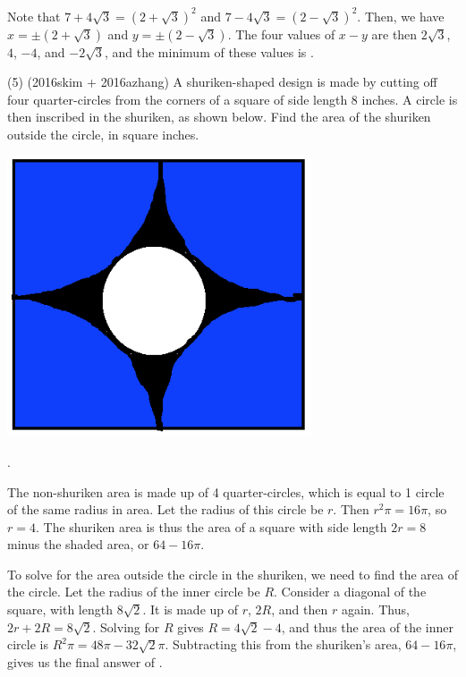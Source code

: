 \documentclass[11pt]{article}
\begin{document}
\begin{solution}
Note that $7 + 4\sqrt{3} = (2 + \sqrt{3})^2$ and $7 - 4\sqrt{3} = (2 - \sqrt{3})^2$. Then, we have $x = \pm(2 + \sqrt{3})$ and $y = \pm(2 - \sqrt{3})$. The four values of $x-y$ are then $2\sqrt{3}$, $4$, $-4$, and $-2\sqrt{3}$, and the minimum of these values is .
\end{solution}

\begin{problem}
(5) (2016skim + 2016azhang) A shuriken-shaped design is made by cutting off four quarter-circles from the corners of a square of side length 8 inches. A circle is then inscribed in the shuriken, as shown below. Find the area of the shuriken outside the circle, in square inches.
\begin{center}
\includegraphics[width=9cm]{shuriken.png}
\end{center}
\end{problem}

\begin{answer}
.
\end{answer}

\begin{solution}
The non-shuriken area is made up of 4 quarter-circles, which is equal to 1 circle of the same radius in area. Let the radius of this circle be $r$. Then $r^{2}\pi = 16\pi$, so $r = 4$. The shuriken area is thus the area of a square with side length $2r = 8$ minus the shaded area, or $64 - 16\pi$.

To solve for the area outside the circle in the shuriken, we need to find the area of the circle. Let the radius of the inner circle be $R$. Consider a diagonal of the square, with length $8\sqrt{2}$. It is made up of $r$, $2R$, and then $r$ again. Thus, $2r + 2R = 8\sqrt{2}$. Solving for $R$ gives $R = 4\sqrt{2} - 4$, and thus the area of the inner circle is $R^2\pi = 48\pi - 32\sqrt{2}\pi$. Subtracting this from the shuriken's area, $64 - 16\pi$, gives us the final answer of .
\end{solution}
\end{document}
